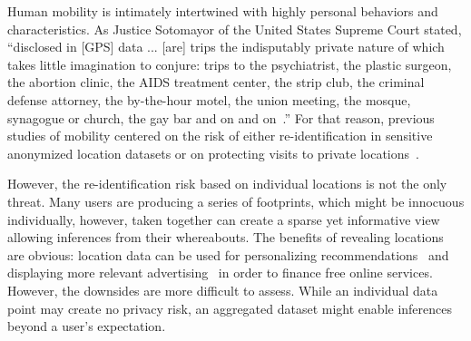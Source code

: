 Human mobility is intimately intertwined with highly personal behaviors and characteristics. As Justice Sotomayor of the United States Supreme Court stated, ``disclosed in [GPS] data ... [are] trips the indisputably private nature of which takes little imagination to conjure: trips to the psychiatrist, the plastic surgeon, the abortion clinic, the AIDS treatment center, the strip club, the criminal defense attorney, the by-the-hour motel, the union meeting, the mosque, synagogue or church, the gay bar and on and on~\cite{jones2012us}.'' For that reason, previous studies of mobility centered on the risk of either re-identification in sensitive anonymized location datasets or on protecting visits to private locations~\cite{de2013unique,Guha:2012ws}.

However, the re-identification risk based on individual locations is not the only threat. Many users are producing a series of footprints, which might be innocuous individually, however, taken together can create a sparse yet informative view allowing inferences from their whereabouts. The benefits of revealing locations are obvious: location data can be used for personalizing recommendations~\cite{ICWSM112886} and displaying more relevant advertising~\cite{Lindamood:2009:IPI:1526709.1526899} in order to finance free online services. However, the downsides are more difficult to assess. While an individual data point may create no privacy risk, an aggregated dataset might enable inferences beyond a user's expectation.

